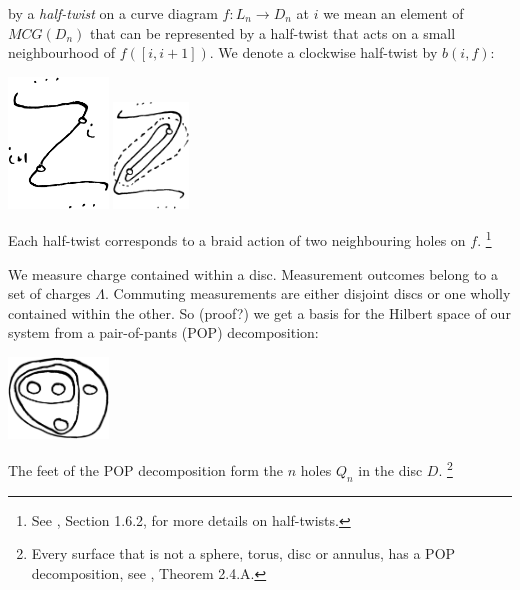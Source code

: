\documentclass[11pt,a4paper]{article}
\begin{document}
 by a {\it half-twist} on a curve
diagram $f:L_n\to D_n$ at $i$ we mean an element of $MCG(D_n)$
that can be represented by a half-twist that acts
on a small neighbourhood of $f([i, i+1]).$
We denote a clockwise half-twist by $b(i, f):$

\begin{center}
\includegraphics[width=0.2\textwidth]{halftwist-1.eps}
\includegraphics[width=0.15\textwidth]{halftwist-2.eps}
\end{center}

Each half-twist corresponds to a braid action of two neighbouring
holes on $f$.
\footnote{See \cite{Kassel10}, Section 1.6.2, for more details on half-twists.}




We measure charge contained within a disc. %
Measurement outcomes belong to a set of charges $\Lambda.$
Commuting measurements are either disjoint discs or
one wholly contained within the other.
So (proof?) we get a basis for the Hilbert space of our system from
a pair-of-pants (POP) decomposition:

\begin{center}
\includegraphics[width=0.2\textwidth]{POP-1.eps}
\end{center}

The feet of the POP decomposition form the $n$ holes $Q_n$ in the disc $D$.
\footnote{Every surface that is not a sphere, torus, disc or annulus, has
a POP decomposition, see \cite{Ivanov01}, Theorem 2.4.A.}
\end{document}
